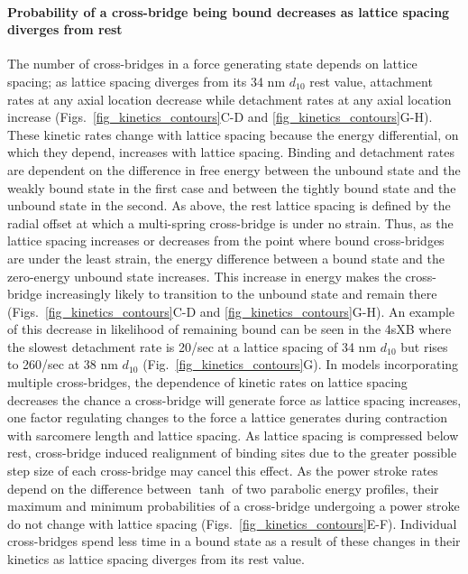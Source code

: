 \documentclass[]{article}
\begin{document}
\paragraph{Probability of a cross-bridge being bound decreases as lattice spacing diverges from rest} %
The number of cross-bridges in a force generating state depends on lattice spacing; as lattice spacing diverges from its 34 nm $d_{10}$ rest value, attachment rates at any axial location decrease while detachment rates at any axial location increase (Figs.~\ref{fig_kinetics_contours}C-D and \ref{fig_kinetics_contours}G-H). 
These kinetic rates change with lattice spacing because the energy differential, on which they depend, increases with lattice spacing.
Binding and detachment rates are dependent on the difference in free energy between the unbound state and the weakly bound state in the first case and between the tightly bound state and the unbound state in the second.
As above, the rest lattice spacing is defined by the radial offset at which a multi-spring cross-bridge is under no strain. 
Thus, as the lattice spacing increases or decreases from the point where bound cross-bridges are under the least strain, the energy difference between a bound state and the zero-energy unbound state increases. 
This increase in energy makes the cross-bridge increasingly likely to transition to the unbound state and remain there (Figs.~\ref{fig_kinetics_contours}C-D and  \ref{fig_kinetics_contours}G-H). 
An example of this decrease in likelihood of remaining bound can be seen in the 4sXB where the slowest detachment rate is 20/sec at a lattice spacing of 34 nm $d_{10}$ but rises to 260/sec at 38 nm $d_{10}$ (Fig.~\ref{fig_kinetics_contours}G).
In models incorporating multiple cross-bridges, the dependence of kinetic rates on lattice spacing decreases the chance a cross-bridge will generate force as lattice spacing increases, one factor regulating changes to the force a lattice generates during contraction with sarcomere length and lattice spacing.
As lattice spacing is compressed below rest, cross-bridge induced realignment of binding sites due to the greater possible step size of each cross-bridge may cancel this effect.
As the power stroke rates depend on the difference between $\tanh$ of two parabolic energy profiles, their maximum and minimum probabilities of a cross-bridge undergoing a power stroke do not change with lattice spacing (Figs.~\ref{fig_kinetics_contours}E-F). 
Individual cross-bridges spend less time in a bound state as a result of these changes in their kinetics as lattice spacing diverges from its rest value.
\end{document}
